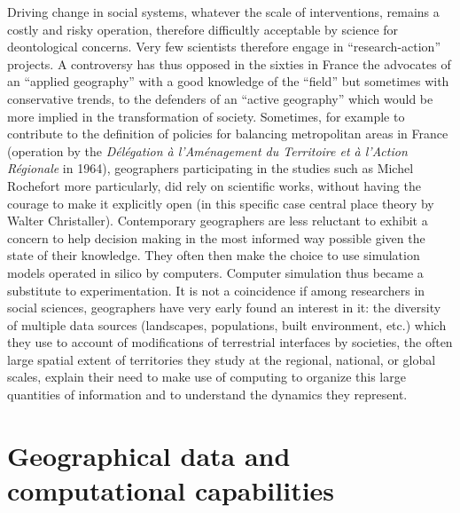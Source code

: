 \documentclass[10pt]{article}
\begin{document}
Driving change in social systems, whatever the scale of interventions, remains a costly and risky operation, therefore difficultly acceptable by science for deontological concerns. Very few scientists therefore engage in ``research-action'' projects. A controversy has thus opposed in the sixties in France the advocates of an ``applied geography'' with a good knowledge of the ``field'' but sometimes with conservative trends, to the defenders of an ``active geography'' which would be more implied in the transformation of society. Sometimes, for example to contribute to the definition of policies for balancing metropolitan areas in France (operation by the \emph{D{\'e}l{\'e}gation à l'Am{\'e}nagement du Territoire et à l'Action R{\'e}gionale} in 1964), geographers participating in the studies such as Michel Rochefort more particularly, did rely on scientific works, without having the courage to make it explicitly open (in this specific case central place theory by Walter Christaller). Contemporary geographers are less reluctant to exhibit a concern to help decision making in the most informed way possible given the state of their knowledge. They often then make the choice to use simulation models operated in silico by computers. Computer simulation thus became a substitute to experimentation. It is not a coincidence if among researchers in social sciences, geographers have very early found an interest in it: the diversity of multiple data sources (landscapes, populations, built environment, etc.) which they use to account of modifications of terrestrial interfaces by societies, the often large spatial extent of territories they study at the regional, national, or global scales, explain their need to make use of computing to organize this large quantities of information and to understand the dynamics they represent.



\section{Geographical data and computational capabilities}
\end{document}
